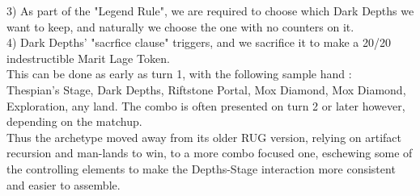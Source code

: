 \documentclass{report}
\begin{document}
3) As part of the "Legend Rule", we are required to choose which Dark Depths we want to keep, and naturally we choose the one with no counters on it.\\
4) Dark Depths' "sacrfice clause" triggers, and we sacrifice it to make a 20/20 indestructible Marit Lage Token.\\
This can be done as early as turn 1, with the following sample hand : \\Thespian's Stage, Dark Depths, Riftstone Portal, Mox Diamond, Mox Diamond, Exploration, any land.
The combo is often presented on turn 2 or later however, depending on the matchup.\\
Thus the archetype moved away from its older RUG version, relying on artifact recursion and man-lands to win, to a more combo focused one, eschewing some of the controlling elements to make the Depths-Stage interaction more consistent and easier to assemble.
\end{document}
